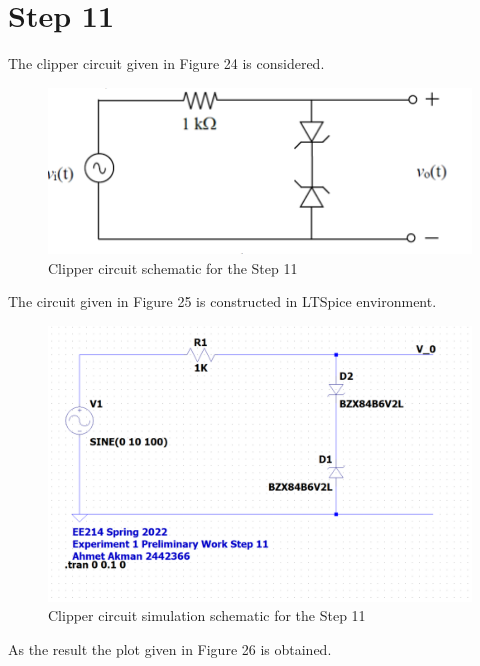\documentclass[letterpaper,12pt]{article}
\begin{document}
\section{Step 11}
The clipper circuit given in Figure 24 is considered. 
\begin{figure}[H]
    \centering
   \includegraphics[width=1\textwidth]{11_1.png}
   \caption{Clipper circuit schematic for the Step 11}
\end{figure} 
The circuit given in Figure 25 is constructed in LTSpice environment.

\begin{figure}[H]
\centering
\includegraphics[width=1\textwidth]{11SCH.png}
\caption{Clipper circuit simulation schematic for the Step 11}
\end{figure} 

As the result the plot given in Figure 26 is obtained.
\end{document}
